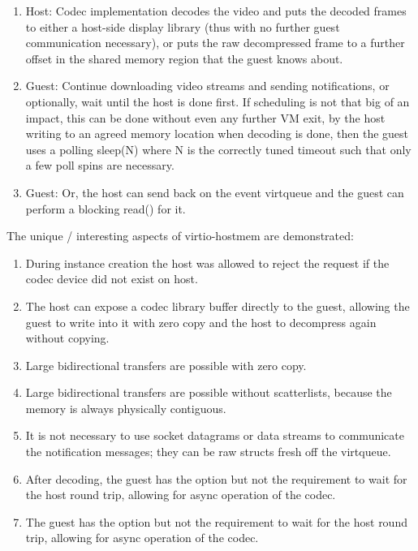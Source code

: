 \begin{enumerate}
\item Host: Codec implementation decodes the video and puts the decoded frames
    to either a host-side display library (thus with no further guest
        communication necessary), or puts the raw decompressed frame to a
        further offset in the shared memory region that the guest knows about.

\item Guest: Continue downloading video streams and sending notifications,
    or optionally, wait until the host is done first. If scheduling is not that
        big of an impact, this can be done without even any further VM exit, by
        the host writing to an agreed memory location when decoding is done,
        then the guest uses a polling sleep(N) where N is the correctly tuned
        timeout such that only a few poll spins are necessary.

\item Guest: Or, the host can send back on the event virtqueue 
    and the guest can perform a blocking read() for it.

\end{enumerate}

The unique / interesting aspects of virtio-hostmem are demonstrated:

\begin{enumerate}

\item During instance creation the host was allowed to reject the request if
    the codec device did not exist on host.

\item The host can expose a codec library buffer directly to the guest,
    allowing the guest to write into it with zero copy and the host to decompress again without copying.

\item Large bidirectional transfers are possible with zero copy.

\item Large bidirectional transfers are possible without scatterlists, because
    the memory is always physically contiguous.

\item It is not necessary to use socket datagrams or data streams to
    communicate the notification messages; they can be raw structs fresh off the
        virtqueue.

\item After decoding, the guest has the option but not the requirement to wait
    for the host round trip, allowing for async operation of the codec.

\item The guest has the option but not the requirement to wait for the host
    round trip, allowing for async operation of the codec.

\end{enumerate}

